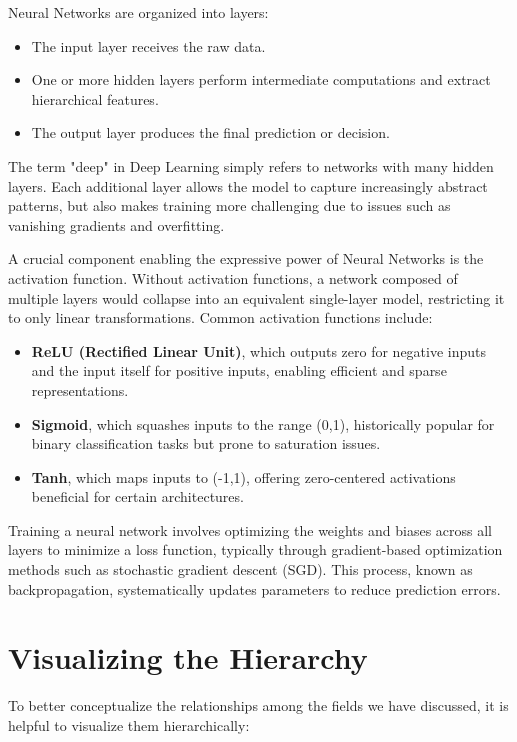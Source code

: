\documentclass[openany]{book}
\begin{document}
Neural Networks are organized into layers:

\begin{itemize}
    \item The input layer receives the raw data.
    \item One or more hidden layers perform intermediate computations and 
    extract hierarchical features.
    \item The output layer produces the final prediction or decision.
\end{itemize}

The term "deep" in Deep Learning simply refers to networks with many hidden 
layers. Each additional layer allows the model to capture increasingly abstract 
patterns, but also makes training more challenging due to issues such as 
vanishing gradients and overfitting.

A crucial component enabling the expressive power of Neural Networks is the 
activation function. Without activation functions, a network composed of 
multiple layers would collapse into an equivalent single-layer model, 
restricting it to only linear transformations. Common activation functions 
include:

\begin{itemize}
    \item \textbf{ReLU (Rectified Linear Unit)}, which outputs zero for 
    negative inputs and the input itself for positive inputs, enabling efficient 
    and sparse representations.
    \item \textbf{Sigmoid}, which squashes inputs to the range (0,1), 
    historically popular for binary classification tasks but prone to saturation 
    issues.
    \item \textbf{Tanh}, which maps inputs to (-1,1), offering zero-centered 
    activations beneficial for certain architectures.
\end{itemize}

Training a neural network involves optimizing the weights and biases across all 
layers to minimize a loss function, typically through gradient-based 
optimization methods such as stochastic gradient descent (SGD). This process, 
known as backpropagation, systematically updates parameters to reduce prediction
errors.

\section{Visualizing the Hierarchy}

To better conceptualize the relationships among the fields we have discussed, 
it is helpful to visualize them hierarchically:
\end{document}
